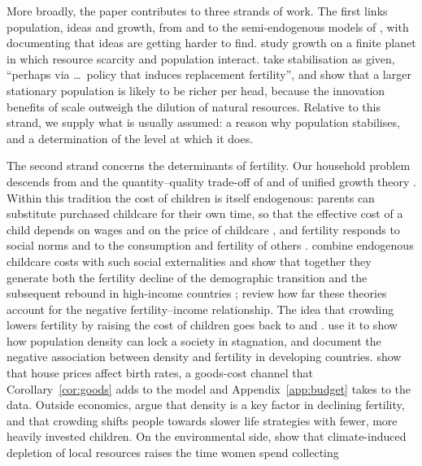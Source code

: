 \documentclass[11pt]{article}
\begin{document}
More broadly, the paper contributes to three strands of work. The first links population, ideas and growth, from
\citet{romer1990} and \citet{kremer1993} to the semi-endogenous models of \citet{jones1995}, with
\citet{bloom2020} documenting that ideas are getting harder to find. \citet{peretto2015} study growth on
a finite planet in which resource scarcity and population interact. \citet{edenkuruc2026} take
stabilisation as given, ``perhaps via \ldots\ policy that induces replacement fertility'', and show that a
larger stationary population is likely to be richer per head, because the innovation benefits of scale
outweigh the dilution of natural resources. Relative to this strand, we supply what is usually assumed: a
reason why population stabilises, and a determination of the level at which it does.

The second strand concerns the determinants of fertility. Our household problem descends from
\citet{barro1989} and the quantity--quality trade-off of \citet{beckerlewis1973} and of unified growth
theory \citep{galor2000,doep05}. Within this tradition the cost of children is itself endogenous: parents
can substitute purchased childcare for their own time, so that the effective cost of a child depends on
wages and on the price of childcare \citep{hazan15,day2016}, and fertility responds to social norms and to
the consumption and fertility of others \citep{palivos2001,munshi2006}. \citet{Dz} combine endogenous
childcare costs with such social externalities and show that together they generate both the fertility
decline of the demographic transition and the subsequent rebound in high-income countries
\citep{myrskyla2009}; \citet{jones11} review how far these theories account for the negative
fertility--income relationship. The idea that crowding lowers fertility by raising the cost of children
goes back to \citet{goodsell} and \citet{thompson}. \citet{DAO2013442} use it to show how population density
can lock a society in stagnation, and \citet{DELACROIX201713} document the negative association between
density and fertility in developing countries. \citet{dettling2014} show that house prices affect
birth rates, a goods-cost channel that Corollary~\ref{cor:goods} adds to the model and
Appendix~\ref{app:budget} takes to the data. Outside economics, \citet{lutz2006} argue that density is a
key factor in declining fertility, and \citet{sng2017} that crowding shifts people towards slower life
strategies with fewer, more heavily invested children. On the environmental side,
\citet{dao25} show that climate-induced depletion of local resources raises the time women spend collecting
\end{document}
